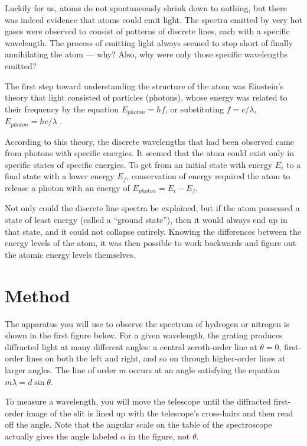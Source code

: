 Luckily for us, atoms do not spontaneously shrink down to
nothing, but there was indeed evidence that atoms could emit
light. The spectra emitted by very hot gases were observed
to consist of patterns of discrete lines, each with a
specific wavelength. The process of emitting light always
seemed to stop short of finally annihilating the atom ---
why? Also, why were only those specific wavelengths emitted?

The first step toward understanding the structure of the atom was
Einstein's theory that light consisted of particles
(photons), whose energy was related to their frequency by
the equation $E_{photon}=hf$, or substituting
$f=c/\lambda$, $E_{photon}=hc/\lambda$  .

According to this theory, the discrete wavelengths that had
been observed came from photons with specific energies. It
seemed that the atom could exist only in specific states of
specific energies. To get from an initial state with energy
$E_i$ to a final state with a lower energy $E_f$, conservation
of energy required the atom to release a photon with an
energy of $E_{photon}=E_i-E_f$. 

Not only could the discrete line spectra be explained, but
if the atom possessed a state of least energy (called a
``ground state''), then it would always end up in that
state, and it could not collapse entirely. Knowing the
differences between the energy levels of the atom, it was
then possible to work backwards and figure out the atomic energy levels
themselves. 

\section*{Method}

The apparatus you will use to observe the spectrum of
hydrogen or nitrogen is shown in the first figure below. For a given wavelength, the
grating produces diffracted light at many different angles:
a central zeroth-order line at $\theta=0$, first-order lines on
both the left and right, and so on through higher-order
lines at larger angles.  The line of order $m$ occurs at an
angle satisfying the equation $m\lambda=d\sin\theta$.

To measure a wavelength, you will move the telescope until
the diffracted first-order image of the slit is lined up
with the telescope's cross-hairs and then read off the
angle. Note that the angular scale on the table of the
spectroscope actually gives the angle labeled $\alpha$ in
the figure, not $\theta$.

